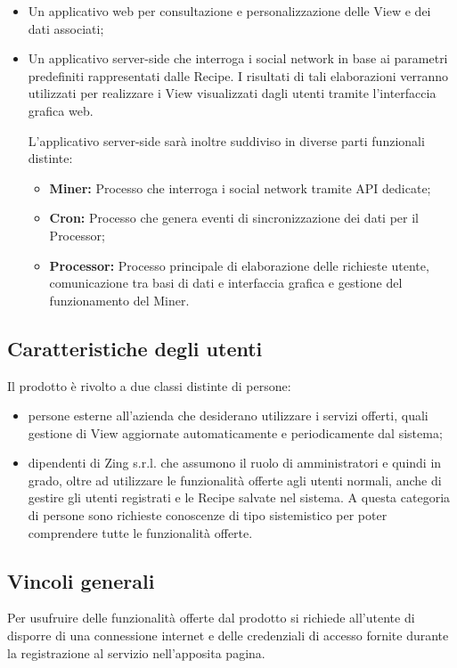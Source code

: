 \begin{itemize}
\item Un applicativo web per consultazione e personalizzazione delle View e dei dati associati;
\item Un applicativo server-side che interroga i social network in base ai parametri predefiniti rappresentati dalle Recipe. I risultati di tali elaborazioni verranno utilizzati per realizzare i View visualizzati dagli utenti tramite l'interfaccia grafica web.

L'applicativo server-side sarà inoltre suddiviso in diverse parti funzionali distinte:
\begin{itemize}
\item \textbf{Miner:} Processo che interroga i social network tramite API dedicate;
\item \textbf{Cron:} Processo che genera eventi di sincronizzazione dei dati per il Processor;
\item \textbf{Processor:} Processo principale di elaborazione delle richieste utente, comunicazione tra basi di dati e interfaccia grafica e gestione del funzionamento del Miner.
\end{itemize}

\end{itemize}

\subsection{Caratteristiche degli utenti}
Il prodotto è rivolto a due classi distinte di persone:

\begin{itemize}
\item persone esterne all'azienda che desiderano utilizzare i servizi offerti, quali gestione di View aggiornate automaticamente e periodicamente dal sistema;
\item dipendenti di Zing s.r.l. che assumono il ruolo di amministratori e quindi in grado, oltre ad utilizzare le funzionalità offerte agli utenti normali, anche di gestire gli utenti registrati e le Recipe salvate nel sistema.
A questa categoria di persone sono richieste conoscenze di tipo sistemistico per poter comprendere tutte le funzionalità offerte.
\end{itemize}


\subsection{Vincoli generali}
Per usufruire delle funzionalità offerte dal prodotto si richiede all'utente di disporre
di una connessione internet e delle credenziali di accesso fornite durante la registrazione al servizio nell'apposita pagina.

